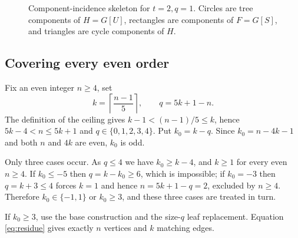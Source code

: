 \documentclass[smallextended,natbib,nospthms]{svjour3}
\theoremstyle{definition}
\theoremstyle{remark}
\newcommand{\ceil}[1]{\left\lceil #1\right\rceil}
\begin{document}
\begin{figure}[t]
\centering
{}
\caption{Component-incidence skeleton for $t=2,q=1$. Circles are tree
components of $H=G[U]$, rectangles are components of $F=G[S]$, and triangles
are cycle components of $H$.}
\label{fig:construction}
\end{figure}

\subsection{Covering every even order}

Fix an even integer $n\geq 4$, set
\[
  k=\ceil{\frac{n-1}{5}},
  \qquad
  q=5k+1-n.
\]
The definition of the ceiling gives $k-1<(n-1)/5\leq k$, hence
$5k-4<n\leq 5k+1$ and $q\in\{0,1,2,3,4\}$. Put $k_0=k-q$. Since
$k_0=n-4k-1$ and both $n$ and $4k$ are even, $k_0$ is odd.

Only three cases occur. As $q\leq 4$ we have $k_0\geq k-4$, and $k\geq 1$ for
every even $n\geq 4$. If $k_0\leq -5$ then $q=k-k_0\geq 6$, which is
impossible; if $k_0=-3$ then $q=k+3\leq 4$ forces $k=1$ and hence
$n=5k+1-q=2$, excluded by $n\geq 4$. Therefore $k_0\in\{-1,1\}$ or
$k_0\geq 3$, and these three cases are treated in turn.

If $k_0\geq 3$, use the base construction and the size-$q$ leaf replacement.
Equation \eqref{eq:residue} gives exactly $n$ vertices and $k$ matching edges.
\end{document}
